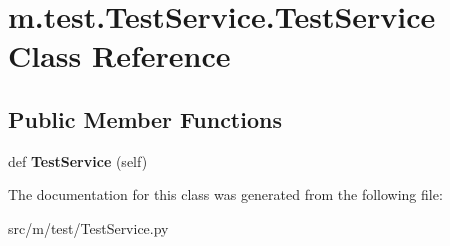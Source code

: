 \hypertarget{classm_1_1test_1_1_test_service_1_1_test_service}{}\section{m.\+test.\+Test\+Service.\+Test\+Service Class Reference}
\label{classm_1_1test_1_1_test_service_1_1_test_service}
\subsection*{Public Member Functions}
\begin{DoxyCompactItemize}
\item 
\hypertarget{classm_1_1test_1_1_test_service_1_1_test_service_aa0ee8828422ebf79742546b0bff60f72}{}def {\bfseries Test\+Service} (self)\label{classm_1_1test_1_1_test_service_1_1_test_service_aa0ee8828422ebf79742546b0bff60f72}

\end{DoxyCompactItemize}


The documentation for this class was generated from the following file\+:\begin{DoxyCompactItemize}
\item 
src/m/test/Test\+Service.\+py\end{DoxyCompactItemize}
